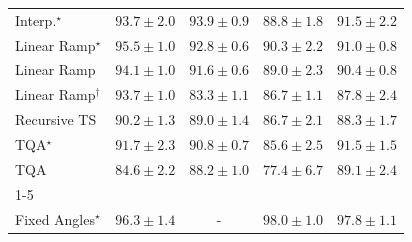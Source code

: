 \begin{tabular}{l|cccc|}
Interp.$^\star$ & {\cellcolor[HTML]{005E33}} \color[HTML]{F1F1F1} $93.7\pm 2.0$ & {\cellcolor[HTML]{005D33}} \color[HTML]{F1F1F1} $93.9\pm 0.9$ & {\cellcolor[HTML]{15793E}} \color[HTML]{F1F1F1} $88.8\pm 1.8$ & {\cellcolor[HTML]{056C39}} \color[HTML]{F1F1F1} $91.5\pm 2.2$ \\
Linear Ramp$^\star$ & {\cellcolor[HTML]{00532F}} \color[HTML]{F1F1F1} $95.5\pm 1.0$ & {\cellcolor[HTML]{006435}} \color[HTML]{F1F1F1} $92.8\pm 0.6$ & {\cellcolor[HTML]{0B713B}} \color[HTML]{F1F1F1} $90.3\pm 2.2$ & {\cellcolor[HTML]{076D39}} \color[HTML]{F1F1F1} $91.0\pm 0.8$ \\
Linear Ramp & {\cellcolor[HTML]{005C32}} \color[HTML]{F1F1F1} $94.1\pm 1.0$ & {\cellcolor[HTML]{036B38}} \color[HTML]{F1F1F1} $91.6\pm 0.6$ & {\cellcolor[HTML]{13773D}} \color[HTML]{F1F1F1} $89.0\pm 2.3$ & {\cellcolor[HTML]{0B713B}} \color[HTML]{F1F1F1} $90.4\pm 0.8$ \\
Linear Ramp$^\dagger$ & {\cellcolor[HTML]{005E33}} \color[HTML]{F1F1F1} $93.7\pm 1.0$ & {\cellcolor[HTML]{339951}} \color[HTML]{F1F1F1} $83.3\pm 1.1$ & {\cellcolor[HTML]{218242}} \color[HTML]{F1F1F1} $86.7\pm 1.1$ & {\cellcolor[HTML]{1A7D40}} \color[HTML]{F1F1F1} $87.8\pm 2.4$ \\
Recursive TS & {\cellcolor[HTML]{0C723B}} \color[HTML]{F1F1F1} $90.2\pm 1.3$ & {\cellcolor[HTML]{13773D}} \color[HTML]{F1F1F1} $89.0\pm 1.4$ & {\cellcolor[HTML]{218242}} \color[HTML]{F1F1F1} $86.7\pm 2.1$ & {\cellcolor[HTML]{177B3F}} \color[HTML]{F1F1F1} $88.3\pm 1.7$ \\
TQA$^\star$ & {\cellcolor[HTML]{026A38}} \color[HTML]{F1F1F1} $91.7\pm 2.3$ & {\cellcolor[HTML]{086E3A}} \color[HTML]{F1F1F1} $90.8\pm 0.7$ & {\cellcolor[HTML]{278946}} \color[HTML]{F1F1F1} $85.6\pm 2.5$ & {\cellcolor[HTML]{056C39}} \color[HTML]{F1F1F1} $91.5\pm 1.5$ \\
TQA & {\cellcolor[HTML]{2D914B}} \color[HTML]{F1F1F1} $84.6\pm 2.2$ & {\cellcolor[HTML]{187B3F}} \color[HTML]{F1F1F1} $88.2\pm 1.0$ & {\cellcolor[HTML]{61BB6D}} \color[HTML]{F1F1F1} $77.4\pm 6.7$ & {\cellcolor[HTML]{13773D}} \color[HTML]{F1F1F1} $89.1\pm 2.4$ \\
\cline{1-5}
\multicolumn{5}{c}{\rule{0pt}{8pt}SV} \\
\midrule
Fixed Angles$^\star$ & {\cellcolor[HTML]{034267}} \color[HTML]{F1F1F1} $96.3\pm 1.4$ & {\cellcolor[HTML]{000000}} \color[HTML]{F1F1F1} {\cellcolor{white}} \color{black} - & {\cellcolor[HTML]{023858}} \color[HTML]{F1F1F1} $98.0\pm 1.0$ & {\cellcolor[HTML]{02395A}} \color[HTML]{F1F1F1} $97.8\pm 1.1$ \\

\end{tabular}
